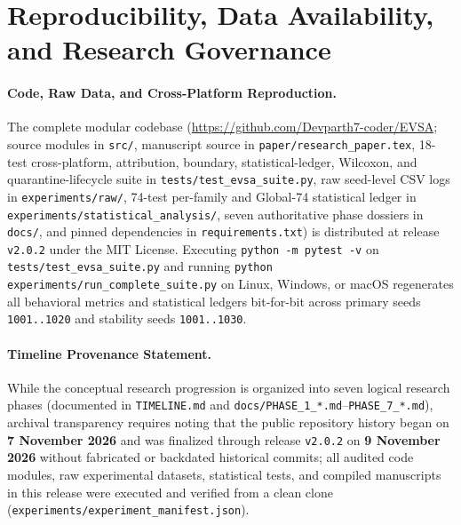 \documentclass[10pt,letterpaper]{article}
\begin{document}
\section{Reproducibility, Data Availability, and Research Governance}
\paragraph{Code, Raw Data, and Cross-Platform Reproduction.}
The complete modular codebase (\url{https://github.com/Devparth7-coder/EVSA}; source modules in \texttt{src/}, manuscript source in \texttt{paper/\allowbreak research\_\allowbreak paper.tex}, 18-test cross-platform, attribution, boundary, statistical-ledger, Wilcoxon, and quarantine-lifecycle suite in \texttt{tests/\allowbreak test\_\allowbreak evsa\_\allowbreak suite.py}, raw seed-level CSV logs in \texttt{experiments/\allowbreak raw/}, 74-test per-family and Global-74 statistical ledger in \texttt{experiments/\allowbreak statistical\_\allowbreak analysis/}, seven authoritative phase dossiers in \texttt{docs/}, and pinned dependencies in \texttt{requirements.txt}) is distributed at release \texttt{v2.0.2} under the MIT License. Executing \texttt{python -m pytest -v} on \texttt{tests/\allowbreak test\_\allowbreak evsa\_\allowbreak suite.py} and running \texttt{python} \texttt{experiments/\allowbreak run\_\allowbreak complete\_\allowbreak suite.py} on Linux, Windows, or macOS regenerates all behavioral metrics and statistical ledgers bit-for-bit across primary seeds \texttt{1001..1020} and stability seeds \texttt{1001..1030}.

\paragraph{Timeline Provenance Statement.}
While the conceptual research progression is organized into seven logical research phases (documented in \texttt{TIMELINE.md} and \texttt{docs/PHASE\_1\_*.md}--\texttt{PHASE\_7\_*.md}), archival transparency requires noting that the public repository history began on \textbf{7 November 2026} and was finalized through release \texttt{v2.0.2} on \textbf{9 November 2026} without fabricated or backdated historical commits; all audited code modules, raw experimental datasets, statistical tests, and compiled manuscripts in this release were executed and verified from a clean clone (\texttt{experiments/experiment\_manifest.json}).
\end{document}
